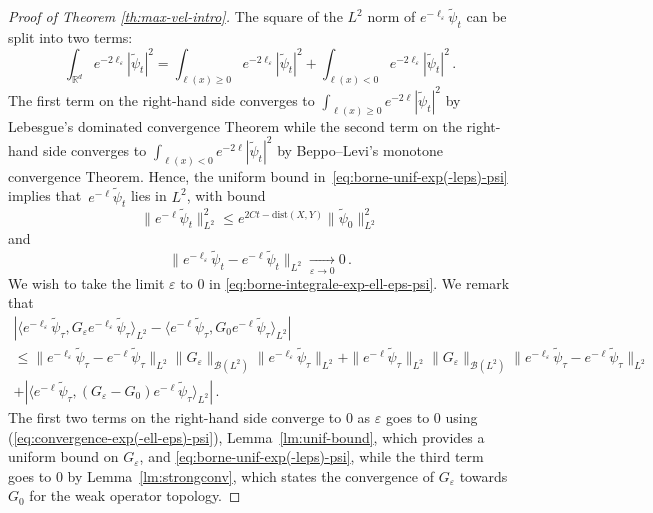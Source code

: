 \documentclass[12pt]{article}
\newcommand{\dXY}{{\mathrm{dist}(X,Y)}}
\theoremstyle{plain}
\newcommand{\Tepsilon}{{G_\varepsilon}}
\newcommand{\Tzero}{{G_0}}
\begin{document}
\begin{proof}[Proof of Theorem \ref{th:max-vel-intro}]
The square of the $L^{2}$ norm of $e^{-\ell_{\varepsilon}}\tilde{\psi}_{t}$ can be split into two terms:
\[
\int_{\mathbb{R}^{d}}e^{-2\ell_{\varepsilon}}|\tilde{\psi}_{t}|^{2}=\int_{\ell(x)\geq0}e^{-2\ell_{\varepsilon}}|\tilde{\psi}_{t}|^{2}+\int_{\ell(x)<0}e^{-2\ell_{\varepsilon}}|\tilde{\psi}_{t}|^{2}\,.
\]
The first term on the right-hand side converges to  $\int_{\ell(x)\geq0}e^{-2\ell}|\tilde{\psi}_{t}|^{2}$
by Lebesgue's dominated convergence Theorem while the second term on the right-hand side converges to $\int_{\ell(x)<0}e^{-2\ell}|\tilde{\psi}_{t}|^{2}$
by Beppo--Levi's monotone convergence Theorem. Hence, the uniform bound in~\eqref{eq:borne-unif-exp(-leps)-psi}
implies that~$e^{-\ell}\tilde{\psi}_{t}$ lies in $L^{2}$, with bound
\[
\|e^{-\ell}\tilde{\psi}_{t}\|_{L^2}^{2}\leq e^{2Ct-\dXY}\|\tilde{\psi}_{0}\|_{L^2}^{2}
\]
 and 
\begin{equation}
\|e^{-\ell_{\varepsilon}}\tilde{\psi}_{t}-e^{-\ell}\tilde{\psi}_{t}\|_{L^{2}}\xrightarrow[\varepsilon\to0]{}0\,. \label{eq:convergence-exp(-ell-eps)-psi}
\end{equation}
We wish to take the limit $\varepsilon$ to $0$ in \eqref{eq:borne-integrale-exp-ell-eps-psi}. We remark that
\begin{multline*}
    |  \langle e^{-\ell_{\varepsilon}}\tilde{\psi}_{\tau},\Tepsilon e^{-\ell_{\varepsilon}}\tilde{\psi}_{\tau}\rangle_{L^{2}}-\langle e^{-\ell}\tilde{\psi}_{\tau},\Tzero e^{-\ell}\tilde{\psi}_{\tau}\rangle_{L^{2}}|\\
  \leq\|e^{-\ell_{\varepsilon}}\tilde{\psi}_{\tau}-e^{-\ell}\tilde{\psi}_{\tau}\|_{L^{2}}\|\Tepsilon \|_{\mathcal{B}(L^{2})}\|e^{-\ell_{\varepsilon}}\tilde{\psi}_{\tau}\|_{L^{2}}
  +\|e^{-\ell}\tilde{\psi}_{\tau}\|_{L^{2}}\|\Tepsilon \|_{\mathcal{B}(L^{2})}\|e^{-\ell_{\varepsilon}}\tilde{\psi}_{\tau}-e^{-\ell}\tilde{\psi}_{\tau}\|_{L^{2}}\\
  +|\langle e^{-\ell}\tilde{\psi}_{\tau},(\Tepsilon -\Tzero )e^{-\ell}\tilde{\psi}_{\tau}\rangle_{L^{2}}|\,.
\end{multline*}
The first two terms on the right-hand side converge to $0$ as $\varepsilon$ goes to 0 using (\ref{eq:convergence-exp(-ell-eps)-psi}), 
Lemma~\ref{lm:unif-bound}, which provides a uniform bound on $\Tepsilon $,
and \eqref{eq:borne-unif-exp(-leps)-psi}, while the third term goes to 0 by  Lemma~\ref{lm:strongconv}, which states the convergence of $\Tepsilon $ towards $\Tzero $ for the weak operator topology.


\end{proof}
\end{document}
